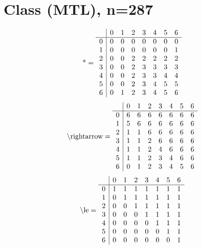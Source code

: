 \documentclass[11pt]{article}
\begin{document}
\section{Class (MTL), n=287}
\[\text{*} = 
\begin{array}{r | r r r r r r r}
 & 0 & 1 & 2 & 3 & 4 & 5 & 6 \\ \hline
0 & 0 & 0 & 0 & 0 & 0 & 0 & 0 \\
1 & 0 & 0 & 0 & 0 & 0 & 0 & 1 \\
2 & 0 & 0 & 2 & 2 & 2 & 2 & 2 \\
3 & 0 & 0 & 2 & 3 & 3 & 3 & 3 \\
4 & 0 & 0 & 2 & 3 & 3 & 4 & 4 \\
5 & 0 & 0 & 2 & 3 & 4 & 5 & 5 \\
6 & 0 & 1 & 2 & 3 & 4 & 5 & 6 \\
\end{array}
\]
\[\text{\textbackslash rightarrow} = 
\begin{array}{r | r r r r r r r}
 & 0 & 1 & 2 & 3 & 4 & 5 & 6 \\ \hline
0 & 6 & 6 & 6 & 6 & 6 & 6 & 6 \\
1 & 5 & 6 & 6 & 6 & 6 & 6 & 6 \\
2 & 1 & 1 & 6 & 6 & 6 & 6 & 6 \\
3 & 1 & 1 & 2 & 6 & 6 & 6 & 6 \\
4 & 1 & 1 & 2 & 4 & 6 & 6 & 6 \\
5 & 1 & 1 & 2 & 3 & 4 & 6 & 6 \\
6 & 0 & 1 & 2 & 3 & 4 & 5 & 6 \\
\end{array}
\]
\[\text{\textbackslash le} = 
\begin{array}{r | r r r r r r r}
 & 0 & 1 & 2 & 3 & 4 & 5 & 6 \\ \hline
0 & 1 & 1 & 1 & 1 & 1 & 1 & 1 \\
1 & 0 & 1 & 1 & 1 & 1 & 1 & 1 \\
2 & 0 & 0 & 1 & 1 & 1 & 1 & 1 \\
3 & 0 & 0 & 0 & 1 & 1 & 1 & 1 \\
4 & 0 & 0 & 0 & 0 & 1 & 1 & 1 \\
5 & 0 & 0 & 0 & 0 & 0 & 1 & 1 \\
6 & 0 & 0 & 0 & 0 & 0 & 0 & 1 \\
\end{array}
\]
\end{document}
